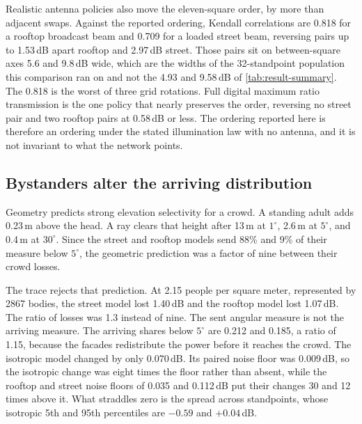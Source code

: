 \documentclass[journal]{IEEEtran}
\begin{document}
Realistic antenna policies also move the eleven-square order, by more than
adjacent swaps. Against the reported ordering, Kendall correlations are 0.818 for
a rooftop broadcast beam and 0.709 for a loaded street beam, reversing pairs up
to 1.53\,dB apart rooftop and 2.97\,dB street. Those pairs sit on
between-square axes 5.6 and 9.8\,dB wide, which are the widths of the
32-standpoint population this comparison ran on and not the 4.93 and 9.58\,dB of
\cref{tab:result-summary}. The 0.818 is the worst of three grid rotations. Full
digital maximum ratio transmission is the one policy that nearly preserves the
order, reversing no street pair and two rooftop pairs at 0.58\,dB or less. The
ordering reported here is therefore an ordering under the stated illumination law
with no antenna, and it is not invariant to what the network points.

\subsection{Bystanders alter the arriving distribution}

Geometry predicts strong elevation selectivity for a crowd. A standing adult
adds 0.23\,m above the head. A ray clears that height after 13\,m at
$1^\circ$, 2.6\,m at $5^\circ$, and 0.4\,m at $30^\circ$. Since the street and
rooftop models send 88\% and 9\% of their measure below $5^\circ$, the geometric
prediction was a factor of nine between their crowd losses.

The trace rejects that prediction. At 2.15 people per square meter, represented
by 2867 bodies, the street model lost 1.40\,dB and the rooftop model lost
1.07\,dB. The ratio of losses was
1.3 instead of nine. The sent angular measure is not the arriving measure. The
arriving shares below $5^\circ$ are 0.212 and 0.185, a ratio of 1.15, because the
facades redistribute the power before it reaches the crowd. The isotropic model
changed by only 0.070\,dB. Its paired noise floor was 0.009\,dB, so the isotropic
change was eight times the floor rather than absent, while the rooftop and street
noise floors of 0.035 and 0.112\,dB put their changes 30 and 12 times above it.
What straddles zero is the spread across standpoints, whose isotropic 5th and
95th percentiles are $-0.59$ and $+0.04$\,dB.
\end{document}
